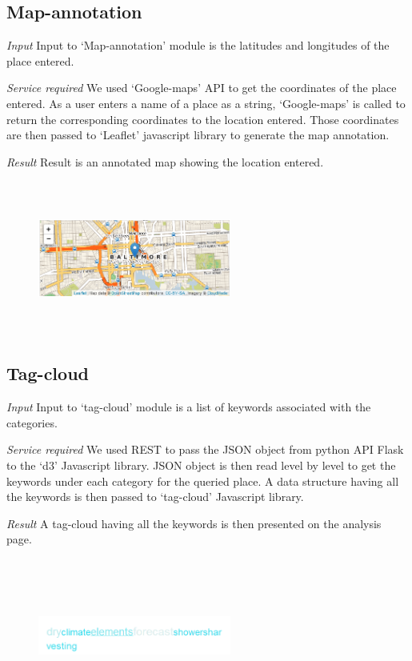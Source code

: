 \documentclass[conference]{IEEEtran}
\begin{document}
\subsection{Map-annotation}
\textit{Input}  Input to ‘Map-annotation’ module is the latitudes and longitudes of the place entered. 

\textit{Service required} We used ‘Google-maps’ API to get the coordinates of the place entered. As a user enters a name of a place as a string, ‘Google-maps’ is called to return the corresponding coordinates to the location entered. Those coordinates are then passed to ‘Leaflet’ javascript library to generate the map annotation. 

\textit{Result} Result is an annotated map showing the location entered.


\begin{figure}[h]
\includegraphics[height=2in, width=2.5in]{3.png}
\label{3}
\end{figure}

\subsection{Tag-cloud}

\textit{Input}  Input to ‘tag-cloud’ module is a list of keywords associated with the categories.

\textit{Service required}  We used REST to pass the JSON object from python API Flask to the ‘d3’ Javascript library. JSON object is then read level by level to get the keywords under each category for the queried place. A data structure having all the keywords is then passed to ‘tag-cloud’ Javascript library. 

\textit{Result}  A tag-cloud having all the keywords is then presented on the analysis page. 

\begin{figure}[h]
\includegraphics[height=2in, width=2.5in]{4.png}
\label{3}
\end{figure}
\end{document}
